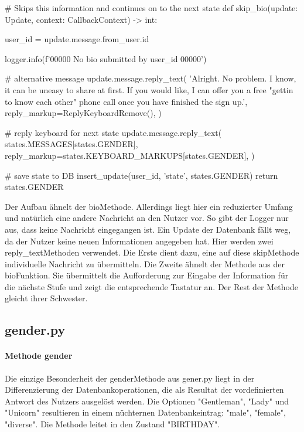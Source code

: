                 \begin{pyverbatim} 
                # Skips this information and continues on to the next state
                def skip_bio(update: Update, context: CallbackContext) -> int:
                    
                    user_id = update.message.from_user.id

                    logger.info(f'00000 No bio submitted by {user_id} 00000')

                    # alternative message
                    update.message.reply_text(
                        'Alright. No problem. I know, it can be uneasy to share at first. If you would like, I can offer you a free "gettin to know each other" phone call once you have finished the sign up.',
                        reply_markup=ReplyKeyboardRemove(),
                        )

                    # reply keyboard for next state
                    update.message.reply_text(
                        states.MESSAGES[states.GENDER],
                        reply_markup=states.KEYBOARD_MARKUPS[states.GENDER],
                        )    

                    # save state to DB
                    insert_update(user_id, 'state', states.GENDER)
                    return states.GENDER
                
                \end{pyverbatim} 

                Der Aufbau ähnelt der bio\-Methode. Allerdings liegt hier ein reduzierter Umfang und natürlich eine andere Nachricht an den Nutzer vor. So gibt der Logger nur aus, dass keine Nachricht eingegangen ist. Ein Update der Datenbank fällt weg, da der Nutzer keine neuen Informationen angegeben hat. Hier werden zwei reply\_text\-Methoden verwendet. Die Erste dient dazu, eine auf diese skip\-Methode individuelle Nachricht zu übermitteln. Die Zweite ähnelt der Methode aus der bio\-Funktion. Sie übermittelt die Aufforderung zur Eingabe der Information für die nächste Stufe und zeigt die entsprechende Tastatur an. Der Rest der Methode gleicht ihrer Schwester.


        \subsection{gender.py}
            \paragraph{Methode gender}
                Die einzige Besonderheit der gender\-Methode aus gener.py liegt in der Differenzierung der Datenbankoperationen, die als Resultat der vordefinierten Antwort des Nutzers ausgelöst werden. Die Optionen "Gentleman", "Lady" und "Unicorn" resultieren in einem nüchternen Datenbankeintrag: "male", "female", "diverse". Die Methode leitet in den Zustand "BIRTHDAY".
            
